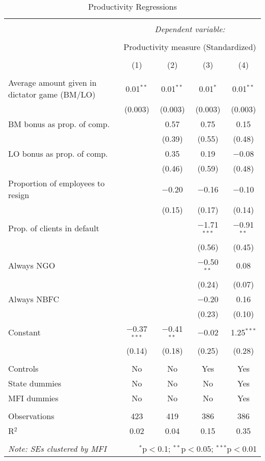 \documentclass[11pt]{article}
\begin{document}
\begin{table}[!htbp] \centering 
  \caption{Productivity Regressions} 
  \label{} 
\footnotesize 
\begin{tabular}{@{\extracolsep{5pt}}lcccc} 
\\[-1.8ex]\hline 
\hline \\[-1.8ex] 
 & \multicolumn{4}{c}{\textit{Dependent variable:}} \\ 
\cline{2-5} 
\\[-1.8ex] & \multicolumn{4}{c}{Productivity measure (Standardized)} \\ 
\\[-1.8ex] & (1) & (2) & (3) & (4)\\ 
\hline \\[-1.8ex] 
 Average amount given in dictator game (BM/LO) & 0.01$^{**}$ & 0.01$^{**}$ & 0.01$^{*}$ & 0.01$^{**}$ \\ 
  & (0.003) & (0.003) & (0.003) & (0.003) \\ 
  BM bonus as prop. of comp. &  & 0.57 & 0.75 & 0.15 \\ 
  &  & (0.39) & (0.55) & (0.48) \\ 
  LO bonus as prop. of comp. &  & 0.35 & 0.19 & $-$0.08 \\ 
  &  & (0.46) & (0.59) & (0.48) \\ 
  Proportion of employees to resign &  & $-$0.20 & $-$0.16 & $-$0.10 \\ 
  &  & (0.15) & (0.17) & (0.14) \\ 
  Prop. of clients in default &  &  & $-$1.71$^{***}$ & $-$0.91$^{**}$ \\ 
  &  &  & (0.56) & (0.45) \\ 
  Always NGO &  &  & $-$0.50$^{**}$ & 0.08 \\ 
  &  &  & (0.24) & (0.07) \\ 
  Always NBFC &  &  & $-$0.20 & 0.16 \\ 
  &  &  & (0.23) & (0.10) \\ 
  Constant & $-$0.37$^{***}$ & $-$0.41$^{**}$ & $-$0.02 & 1.25$^{***}$ \\ 
  & (0.14) & (0.18) & (0.25) & (0.28) \\ 
 \hline \\[-1.8ex] 
Controls & No & No & Yes & Yes \\ 
State dummies & No & No & No & Yes \\ 
MFI dummies & No & No & No & Yes \\ 
\hline \\[-1.8ex] 
Observations & 423 & 419 & 386 & 386 \\ 
R$^{2}$ & 0.02 & 0.04 & 0.15 & 0.35 \\ 
\hline 
\hline \\[-1.8ex] 
\textit{Note: SEs clustered by MFI}  & \multicolumn{4}{r}{$^{*}$p$<$0.1; $^{**}$p$<$0.05; $^{***}$p$<$0.01} \\ 
\end{tabular} 
\end{table} 
\end{document}
